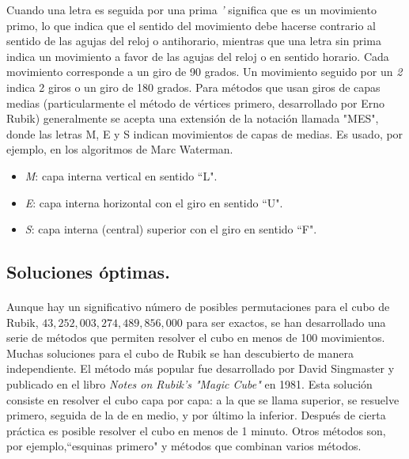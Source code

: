 \documentclass[12pt, letterpaper]{article}
\begin{document}
Cuando una letra es seguida por una prima \emph{'} significa que es un movimiento primo, lo que indica 
que el sentido del movimiento debe hacerse contrario al sentido de las agujas del reloj o antihorario, mientras que una letra sin prima indica un movimiento a favor de las agujas del reloj o en sentido horario. Cada movimiento corresponde a un giro de 90 grados. Un movimiento seguido por un \emph{2} indica 2 giros o un giro de 180 grados.
Para métodos que usan giros de capas medias (particularmente el método de vértices primero, desarrollado por Erno Rubik) generalmente se acepta una extensión de la notación llamada "MES", donde las letras M, E y S indican movimientos de capas de medias. Es usado, por ejemplo, en los algoritmos de Marc Waterman.
\begin{itemize}
	\item \emph{M}: capa interna vertical en sentido ``L".
	\item \emph{E}: capa interna horizontal con el giro en sentido ``U".
	\item \emph{S}: capa interna (central) superior con el giro en sentido ``F".
\end{itemize}
\subsection{Soluciones óptimas.}
\paragraph{}
Aunque hay un significativo número de posibles permutaciones para el cubo de Rubik, $43,252,003,274,489,856,000$ para ser exactos, se han desarrollado una serie de métodos que permiten resolver el cubo en menos de 100 movimientos.
Muchas soluciones para el cubo de Rubik se han descubierto de manera independiente. El método más popular fue desarrollado por David Singmaster y publicado en el libro \emph{Notes on Rubik's "Magic Cube"} en 1981. Esta solución consiste en resolver el cubo capa por capa: a la que se llama superior, se resuelve primero, seguida de la de en medio, y por último la inferior. Después de cierta práctica es posible resolver el cubo en menos de 1 minuto. Otros métodos son, por ejemplo,``esquinas primero" y métodos que combinan varios métodos.
\end{document}
